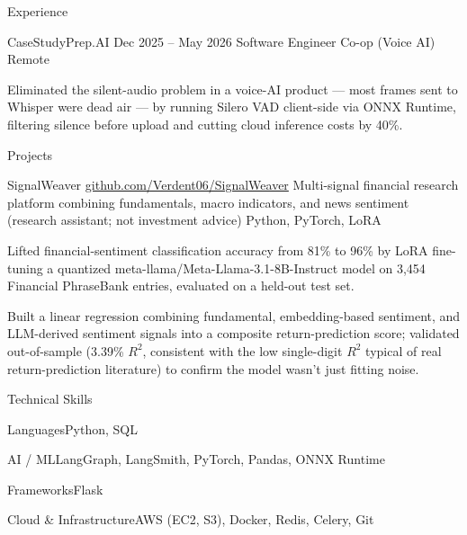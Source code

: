 \documentclass[
	11pt
]{../../../template}
\begin{document}
\begin{rSection}{E}{xperience}
		\begin{rSectionEntry}
			{CaseStudyPrep.AI}
			{Dec 2025 -- May 2026}
			{Software Engineer Co-op (Voice AI)}
			{}
			{Remote}

			\item Eliminated the silent-audio problem in a voice-AI product --- most frames sent to Whisper were dead air --- by running Silero VAD client-side via ONNX Runtime, filtering silence before upload and cutting cloud inference costs by 40\%.
		\end{rSectionEntry}
	\end{rSection}

	\begin{rSection}{P}{rojects}
		\begin{rSectionEntry}
			{SignalWeaver}
			{\href{https://github.com/Verdent06/SignalWeaver}{github.com/Verdent06/SignalWeaver}}
			{Multi-signal financial research platform combining fundamentals, macro indicators, and news sentiment (research assistant; not investment advice)}
			{Python, PyTorch, LoRA}
			{}

			\item Lifted financial-sentiment classification accuracy from 81\% to 96\% by LoRA fine-tuning a quantized meta-llama/Meta-Llama-3.1-8B-Instruct model on 3,454 Financial PhraseBank entries, evaluated on a held-out test set.
			\item Built a linear regression combining fundamental, embedding-based sentiment, and LLM-derived sentiment signals into a composite return-prediction score; validated out-of-sample (3.39\% $R^{2}$, consistent with the low single-digit $R^{2}$ typical of real return-prediction literature) to confirm the model wasn't just fitting noise.
		\end{rSectionEntry}
	\end{rSection}

	\begin{rSection}{T}{echnical Skills}
		\begin{rSet}{Languages}{Python, SQL}
		\end{rSet}
		\begin{rSet}{AI / ML}{LangGraph, LangSmith, PyTorch, Pandas, ONNX Runtime}
		\end{rSet}
		\begin{rSet}{Frameworks}{Flask}
		\end{rSet}
		\begin{rSet}{Cloud \& Infrastructure}{AWS (EC2, S3), Docker, Redis, Celery, Git}
		\end{rSet}
	\end{rSection}
\end{document}
